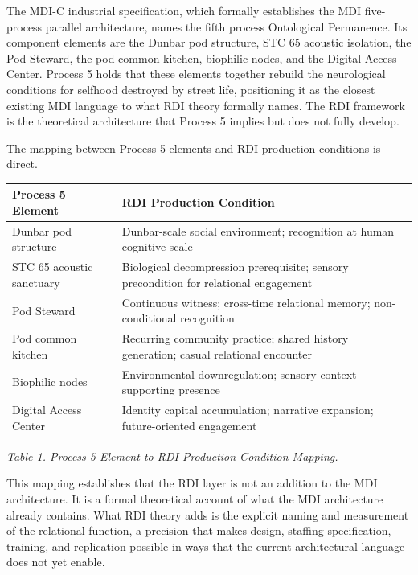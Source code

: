 \documentclass[12pt, letterpaper]{article}
\begin{document}
The MDI-C industrial specification, which formally establishes the MDI five-process parallel architecture, names the fifth process Ontological Permanence. Its component elements are the Dunbar pod structure, STC 65 acoustic isolation, the Pod Steward, the pod common kitchen, biophilic nodes, and the Digital Access Center. Process 5 holds that these elements together rebuild the neurological conditions for selfhood destroyed by street life, positioning it as the closest existing MDI language to what RDI theory formally names. The RDI framework is the theoretical architecture that Process 5 implies but does not fully develop.

The mapping between Process 5 elements and RDI production conditions is direct.

{\singlespacing
\begin{tabularx}{\textwidth}{@{}lX@{}}
\toprule
\rowcolor{rowgray}
Process 5 Element & RDI Production Condition \\
\midrule
Dunbar pod structure & Dunbar-scale social environment; recognition at human cognitive scale \\
\rowcolor{rowgray}
STC 65 acoustic sanctuary & Biological decompression prerequisite; sensory precondition for relational engagement \\
Pod Steward & Continuous witness; cross-time relational memory; non-conditional recognition \\
\rowcolor{rowgray}
Pod common kitchen & Recurring community practice; shared history generation; casual relational encounter \\
Biophilic nodes & Environmental downregulation; sensory context supporting presence \\
\rowcolor{rowgray}
Digital Access Center & Identity capital accumulation; narrative expansion; future-oriented engagement \\
\bottomrule
\end{tabularx}\par
\vspace{8pt}
\noindent\textit{Table 1. Process 5 Element to RDI Production Condition Mapping.}
\par}

This mapping establishes that the RDI layer is not an addition to the MDI architecture. It is a formal theoretical account of what the MDI architecture already contains. What RDI theory adds is the explicit naming and measurement of the relational function, a precision that makes design, staffing specification, training, and replication possible in ways that the current architectural language does not yet enable.
\end{document}
